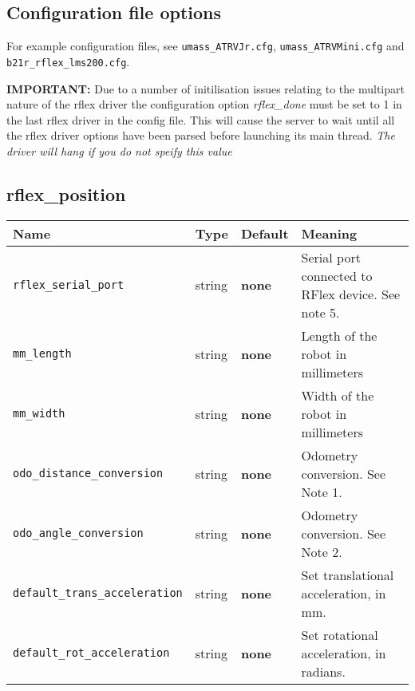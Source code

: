 \subsection*{Configuration file options}
For example configuration
files, see {\tt umass\_ATRVJr.cfg}, {\tt umass\_ATRVMini.cfg} and
{\tt b21r\_rflex\_lms200.cfg}.

\textbf{IMPORTANT: }
Due to a number of initilisation issues relating to the multipart nature of the rflex driver the
configuration option \emph{rflex\_done} must be set to 1 in the last rflex driver in the config file. This will
cause the server to wait until all the rflex driver options have been parsed before launching its main thread.
\emph{The driver will hang if you do not speify this value}

\subsection*{rflex\_position}
\begin{center}
{\small \begin{tabular}{|l|l|l|l|}
\hline
Name & Type & Default & Meaning\\
\hline
{\tt rflex\_serial\_port} & string & {\bf none} & Serial port connected to RFlex device. See note 5.\\
{\tt mm\_length} & string & {\bf none} & Length of the robot in millimeters\\
{\tt mm\_width} & string & {\bf none} & Width of the robot in millimeters\\
{\tt odo\_distance\_conversion} & string & {\bf none} & Odometry conversion. See Note 1.\\
{\tt odo\_angle\_conversion} & string & {\bf none} & Odometry conversion. See Note 2.\\
{\tt default\_trans\_acceleration} & string & {\bf none} & Set translational acceleration, in mm.\\
{\tt default\_rot\_acceleration} & string & {\bf none} & Set rotational acceleration, in radians.\\
\hline
\end{tabular}}
\end{center}

